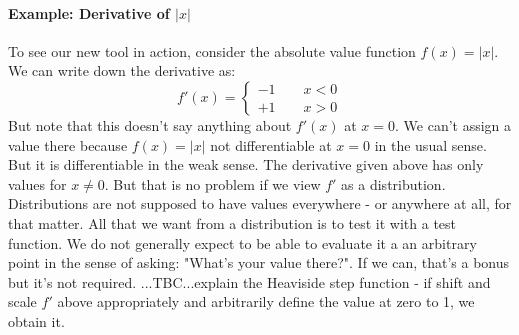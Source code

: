 



\paragraph{Example: Derivative of $|x|$}
To see our new tool in action, consider the absolute value function $f(x) = |x|$. We can write down the derivative as:
\begin{equation}
f'(x) = 
 \begin{cases}
 -1 \qquad  x < 0 \\
 +1 \qquad  x > 0
 \end{cases}
\end{equation}
But note that this doesn't say anything about $f'(x)$ at $x = 0$. We can't assign a value there because $f(x) = |x|$ not differentiable at $x = 0$ in the usual sense. But it is differentiable in the weak sense. The derivative given above has only values for $x \neq 0$. But that is no problem if we view $f'$ as a distribution. Distributions are not supposed to have values everywhere - or anywhere at all, for that matter. All that we want from a distribution is to test it with a test function. We do not generally expect to be able to evaluate it a an arbitrary point in the sense of asking: "What's your value there?". If we can, that's a bonus but it's not required. ...TBC...explain the Heaviside step function - if shift and scale $f'$ above appropriately and arbitrarily define the value at zero to 1, we obtain it.





